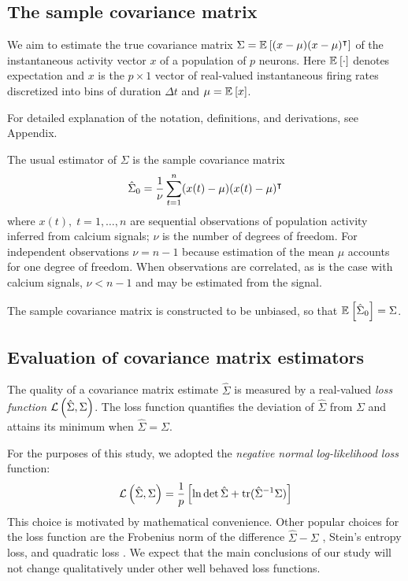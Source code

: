 \subsection*{The sample covariance matrix}
We aim to estimate the true covariance matrix $\Sigma = \mathbb E_{}\left[ (x-\mu)(x-\mu)^\intercal\right]$ of the instantaneous activity vector $x$ of a population of $p$ neurons. Here $\mathbb E_{}\left[ \cdot\right]$ denotes expectation  and $x$ is the $p\times 1$ vector of real-valued instantaneous firing rates discretized into bins of duration $\Delta t$ and $\mu = \mathbb E_{}\left[ x\right]$.  

For detailed explanation of the notation, definitions, and derivations, see Appendix. 

The usual estimator of $\Sigma$ is the sample covariance matrix
\begin{equation}
\hat \Sigma_0 = \frac 1 \nu \sum\limits_{t=1}^n (x(t)-\mu)(x(t)-\mu)^\intercal 
\end{equation}
where $x(t),\;t=1,\ldots,n$ are sequential observations of population activity inferred from calcium signals; $\nu$ is the number of degrees of freedom. For independent observations $\nu=n-1$ because estimation of the mean $\mu$ accounts for one degree of freedom. When observations are correlated, as is the case with calcium signals, $\nu < n-1$ and may be estimated from the signal. 

The sample covariance matrix is constructed to be unbiased, so that $\mathbb E_{}\left[ \hat\Sigma_0\right] = \Sigma$. 

\subsection*{Evaluation of covariance matrix estimators}
The quality of a covariance matrix estimate $\hat\Sigma$ is measured by a real-valued \emph{loss function} $\mathcal L\left(\hat\Sigma,\Sigma\right)$.  The loss function quantifies the deviation of $\hat\Sigma$ from $\Sigma$ and attains its minimum  when $\hat\Sigma = \Sigma$.  

For the purposes of this study, we adopted the \emph{negative normal log-likelihood loss} function:
\begin{equation}\label{eq:loss}
\mathcal L\left(\hat\Sigma,\Sigma\right) = \frac 1 p\left[\ln \det \hat \Sigma + \operatorname{tr}(\hat \Sigma^{-1}\Sigma)\right]
\end{equation}
This choice is motivated by mathematical convenience. Other popular choices for the loss function are the Frobenius norm of the difference $\hat\Sigma-\Sigma$ \cite{Ledoit:2004,Schafer:2005}, Stein's entropy loss, and quadratic loss \cite{James:1961,Fan:2008}.  We expect that the main conclusions of our study will not change qualitatively under other well behaved loss functions.

